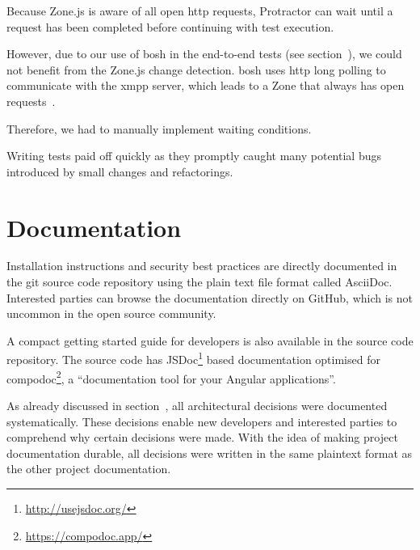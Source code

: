 Because Zone.js is aware of all open \gls{http} requests, Protractor can wait until a request has been completed before continuing with test execution.

However, due to our use of \gls{bosh} in the end-to-end tests (see section~), we could not benefit from the Zone.js change detection.
\gls{bosh} uses \gls{http} long polling to communicate with the \gls{xmpp} server, which leads to a Zone that always has open requests~\cite{xep-0124}.

Therefore, we had to manually implement waiting conditions.

Writing tests paid off quickly as they promptly caught many potential bugs introduced by small changes and refactorings.

\section{Documentation}

Installation instructions and security best practices are directly documented in the git source code repository using the plain text file format called AsciiDoc.
Interested parties can browse the documentation directly on GitHub, which is not uncommon in the open source community.

A compact getting started guide for developers is also available in the source code repository.
The source code has JSDoc\footnote{\url{http://usejsdoc.org/}} based documentation optimised for compodoc\footnote{\url{https://compodoc.app/}}, a ``documentation tool for your Angular applications''.

As already discussed in section~, all architectural decisions were documented systematically.
These decisions enable new developers and interested parties to comprehend why certain decisions were made.
With the idea of making project documentation durable, all decisions were written in the same plaintext format as the other project documentation.
